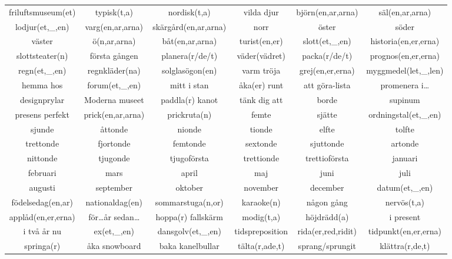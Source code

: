 \begin{center}
    \begin{adjustwidth}{-2.5cm}{}
        \begin{tabular}{|c c c c c c|}
            \hline
            friluftsmuseum(et) & typisk(t,a) & nordisk(t,a) & vilda djur & björn(en,ar,arna) & säl(en,ar,arna) \\
            lodjur(et,\_,en) & varg(en,ar,arna) & skärgård(en,ar,arna) & norr & öster & söder \\
            väster & ö(n,ar,arna) & båt(en,ar,arna) & turist(en,er) & slott(et,\_,en) & historia(en,er,erna) \\
            slottsteater(n) & första gången & planera(r/de/t) & väder(vädret) & packa(r/de/t) & prognos(en,er,erna) \\
            regn(et,\_,en) & regnkläder(na) & solglasögon(en) & varm tröja & grej(en,er,erna) & myggmedel(let,\_,len) \\
            hemma hos & forum(et,\_,en) & mitt i stan & åka(er) runt & att göra-lista & promenera i\ldots \\
            designprylar & Moderna museet & paddla(r) kanot & tänk dig att & borde & supinum \\
            presens perfekt & prick(en,ar,arna) & prickruta(n) & femte & sjätte & ordningstal(et,\_,en) \\
            sjunde & åttonde & nionde & tionde & elfte & tolfte \\
            trettonde & fjortonde & femtonde & sextonde & sjuttonde  & artonde \\
            nittonde & tjugonde & tjugoförsta & trettionde & trettioförsta & januari \\
            februari & mars & april & maj & juni & juli \\
            augusti & september & oktober & november & december & datum(et,\_,en) \\
            födelsedag(en,ar) & nationaldag(en) & sommarstuga(n,or) & karaoke(n) & någon gång & nervös(t,a) \\
            applåd(en,er,erna) & för\ldots år sedan\ldots & hoppa(r) fallskärm & modig(t,a) & höjdrädd(a) & i present \\
            i två år nu & ex(et,\_,en) & dansgolv(et,\_,en) & tidspreposition & rida(er,red,ridit) & tidpunkt(en,er,erna) \\
            springa(r) & åka snowboard & baka kanelbullar & tälta(r,ade,t) & sprang/sprungit & klättra(r,de,t) \\

\end{tabular}
\end{adjustwidth}
\end{center}

